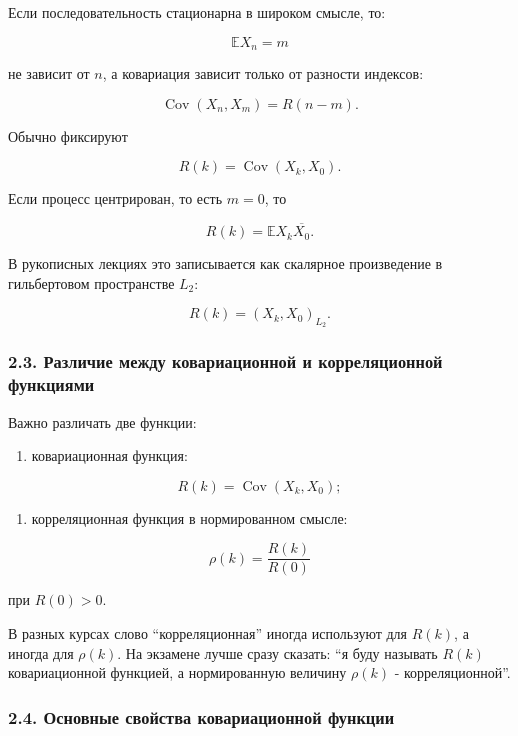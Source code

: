 \documentclass[
  11pt,
  a4paper,
]{article}
\providecommand{\tightlist}{%
  \setlength{\itemsep}{0pt}\setlength{\parskip}{0pt}}
\begin{document}
Если последовательность стационарна в широком смысле, то:

\[
\mathbb EX_n=m
\]

не зависит от \(n\), а ковариация зависит только от разности индексов:

\[
\operatorname{Cov}(X_n,X_m)=R(n-m).
\]

Обычно фиксируют

\[
R(k)=\operatorname{Cov}(X_k,X_0).
\]

Если процесс центрирован, то есть \(m=0\), то

\[
R(k)=\mathbb E X_k\overline{X_0}.
\]

В рукописных лекциях это записывается как скалярное произведение в
гильбертовом пространстве \(L_2\):

\[
R(k)=(X_k,X_0)_{L_2}.
\]

\subsubsection{2.3. Различие между ковариационной и корреляционной
функциями}\label{ux440ux430ux437ux43bux438ux447ux438ux435-ux43cux435ux436ux434ux443-ux43aux43eux432ux430ux440ux438ux430ux446ux438ux43eux43dux43dux43eux439-ux438-ux43aux43eux440ux440ux435ux43bux44fux446ux438ux43eux43dux43dux43eux439-ux444ux443ux43dux43aux446ux438ux44fux43cux438}

Важно различать две функции:

\begin{enumerate}
\def\labelenumi{\arabic{enumi}.}
\tightlist
\item
  ковариационная функция:
\end{enumerate}

\[
R(k)=\operatorname{Cov}(X_k,X_0);
\]

\begin{enumerate}
\def\labelenumi{\arabic{enumi}.}
\setcounter{enumi}{1}
\tightlist
\item
  корреляционная функция в нормированном смысле:
\end{enumerate}

\[
\rho(k)=\frac{R(k)}{R(0)}
\]

при \(R(0)>0\).

В разных курсах слово ``корреляционная'' иногда используют для \(R(k)\),
а иногда для \(\rho(k)\). На экзамене лучше сразу сказать: ``я буду
называть \(R(k)\) ковариационной функцией, а нормированную величину
\(\rho(k)\) - корреляционной''.

\subsubsection{2.4. Основные свойства ковариационной
функции}\label{ux43eux441ux43dux43eux432ux43dux44bux435-ux441ux432ux43eux439ux441ux442ux432ux430-ux43aux43eux432ux430ux440ux438ux430ux446ux438ux43eux43dux43dux43eux439-ux444ux443ux43dux43aux446ux438ux438}
\end{document}
